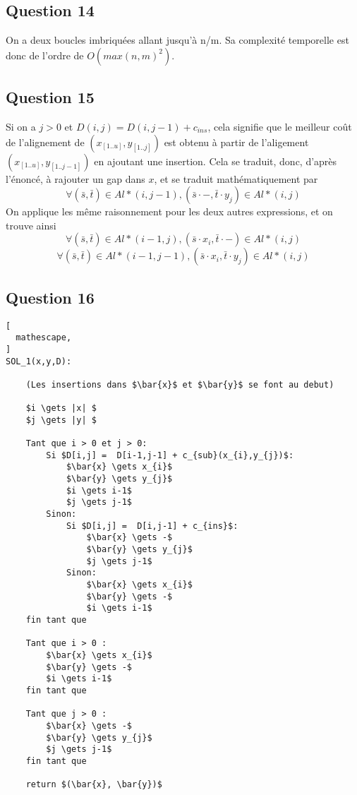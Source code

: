\documentclass{report}
\begin{document}
\subsection*{Question 14}
On a deux boucles imbriquées allant jusqu'à n/m. Sa complexité temporelle est donc de l'ordre de $O(max(n,m)^{2})$.

\subsection*{Question 15}
Si on a $j>0$ et $D(i,j) = D(i,j-1) + c_{ins}$, cela signifie que le meilleur coût de l'alignement de $(x_{[1..u]},y_{[1..j]})$ est obtenu à partir de l'aligement  $(x_{[1..u]},y_{[1..j-1]})$ en ajoutant une insertion. Cela se traduit, donc, d'après l'énoncé, à rajouter un gap dans $x$, et se traduit mathématiquement par 
$$ \forall(\bar{s},\bar{t}) \in Al*(i,j-1),  (\bar{s}\cdot-,\bar{t}\cdot y_{j}) \in Al*(i,j) $$
On applique les même raisonnement pour les deux autres expressions, et on trouve ainsi
$$ \forall(\bar{s},\bar{t}) \in Al*(i-1,j),  (\bar{s}\cdot x_{i},\bar{t}\cdot-) \in Al*(i,j) $$
$$ \forall(\bar{s},\bar{t}) \in Al*(i-1,j-1), (\bar{s}\cdot x_{i},\bar{t}\cdot y_{j})  \in Al*(i,j) $$

\clearpage
\subsection*{Question 16}
\begin{lstlisting}[
  mathescape,
]
SOL_1(x,y,D):

    (Les insertions dans $\bar{x}$ et $\bar{y}$ se font au debut)
    
    $i \gets |x| $
    $j \gets |y| $

    Tant que i > 0 et j > 0:
        Si $D[i,j] =  D[i-1,j-1] + c_{sub}(x_{i},y_{j})$:
            $\bar{x} \gets x_{i}$
            $\bar{y} \gets y_{j}$
            $i \gets i-1$
            $j \gets j-1$
        Sinon:
            Si $D[i,j] =  D[i,j-1] + c_{ins}$:
                $\bar{x} \gets -$
                $\bar{y} \gets y_{j}$
                $j \gets j-1$
            Sinon:
                $\bar{x} \gets x_{i}$
                $\bar{y} \gets -$
                $i \gets i-1$
    fin tant que
                
    Tant que i > 0 :
        $\bar{x} \gets x_{i}$
        $\bar{y} \gets -$
        $i \gets i-1$
    fin tant que
        
    Tant que j > 0 :
        $\bar{x} \gets -$
        $\bar{y} \gets y_{j}$
        $j \gets j-1$
    fin tant que
    
    return $(\bar{x}, \bar{y})$
            
\end{lstlisting}
\end{document}
